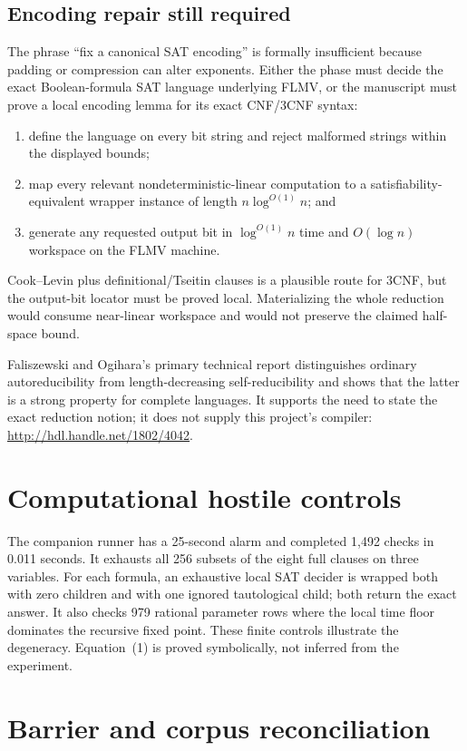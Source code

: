 \documentclass[11pt]{article}
\begin{document}
\subsection*{Encoding repair still required}
The phrase ``fix a canonical SAT encoding'' is formally insufficient because
padding or compression can alter exponents.  Either the phase must decide the
exact Boolean-formula SAT language underlying FLMV, or the manuscript must
prove a local encoding lemma for its exact CNF/3CNF syntax:
\begin{enumerate}
\item define the language on every bit string and reject malformed strings
within the displayed bounds;
\item map every relevant nondeterministic-linear computation to a
satisfiability-equivalent wrapper instance of length
$n\log^{O(1)}n$; and
\item generate any requested output bit in $\log^{O(1)}n$ time and
$O(\log n)$ workspace on the FLMV machine.
\end{enumerate}
Cook--Levin plus definitional/Tseitin clauses is a plausible route for 3CNF,
but the output-bit locator must be proved local.  Materializing the whole
reduction would consume near-linear workspace and would not preserve the
claimed half-space bound.

Faliszewski and Ogihara's primary technical report distinguishes ordinary
autoreducibility from length-decreasing self-reducibility and shows that the
latter is a strong property for complete languages.  It supports the need to
state the exact reduction notion; it does not supply this project's compiler:
\url{http://hdl.handle.net/1802/4042}.

\section{Computational hostile controls}

The companion runner has a 25-second alarm and completed 1,492 checks in
0.011 seconds.  It exhausts all 256 subsets of the eight full clauses on
three variables.  For each formula, an exhaustive local SAT decider is
wrapped both with zero children and with one ignored tautological child; both
return the exact answer.  It also checks 979 rational parameter rows where
the local time floor dominates the recursive fixed point.  These finite
controls illustrate the degeneracy.  Equation~(1) is proved symbolically,
not inferred from the experiment.

\section{Barrier and corpus reconciliation}
\end{document}
